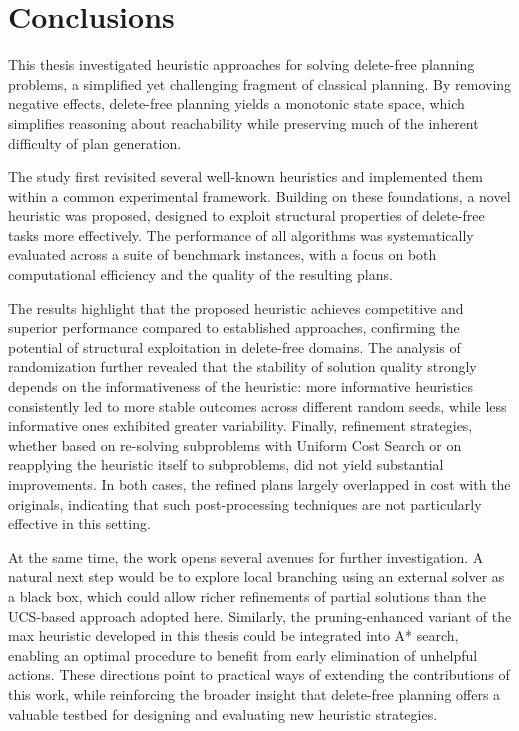 \chapter{Conclusions}
This thesis investigated heuristic approaches for solving delete-free planning problems, a simplified yet challenging fragment of classical planning.
By removing negative effects, delete-free planning yields a monotonic state space, which simplifies reasoning about reachability while preserving
much of the inherent difficulty of plan generation.

The study first revisited several well-known heuristics and implemented them within a common experimental framework. Building on these foundations,
a novel heuristic was proposed, designed to exploit structural properties of delete-free tasks more effectively. The performance of all algorithms
was systematically evaluated across a suite of benchmark instances, with a focus on both computational efficiency and the quality of the resulting plans.

The results highlight that the proposed heuristic achieves competitive and superior performance compared to established approaches,
confirming the potential of structural exploitation in delete-free domains. The analysis of randomization further revealed that the stability of solution
quality strongly depends on the informativeness of the heuristic: more informative heuristics consistently led to more stable outcomes across different
random seeds, while less informative ones exhibited greater variability. Finally, refinement strategies, whether based on re-solving subproblems with
Uniform Cost Search or on reapplying the heuristic itself to subproblems, did not yield substantial improvements. In both cases,
the refined plans largely overlapped in cost with the originals, indicating that such post-processing techniques are not particularly effective in this setting.

At the same time, the work opens several avenues for further investigation. A natural next step would be to explore local branching using an external
solver as a black box, which could allow richer refinements of partial solutions than the UCS-based approach adopted here.
Similarly, the pruning-enhanced variant of the max heuristic developed in this thesis could be integrated into A* search, enabling an optimal procedure
to benefit from early elimination of unhelpful actions. These directions point to practical ways of extending the contributions of this work,
while reinforcing the broader insight that delete-free planning offers a valuable testbed for designing and evaluating new heuristic strategies.
